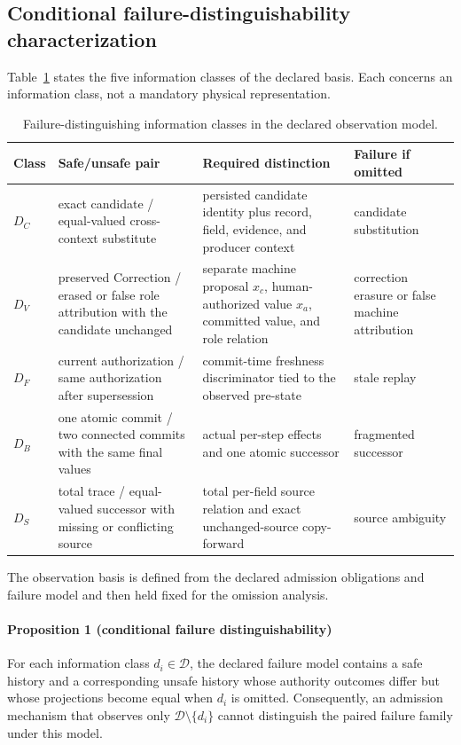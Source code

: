\subsection{Conditional failure-distinguishability characterization}

Table~\ref{tab:distinctions} states the five information classes of the declared basis. Each concerns an information class, not a mandatory physical representation.

\begin{table}[t]
\centering
\footnotesize
\caption{Failure-distinguishing information classes in the declared observation model.}
\label{tab:distinctions}
\begin{tabularx}{\textwidth}{@{}l>{\raggedright\arraybackslash}p{}>{\raggedright\arraybackslash}p{}>{\raggedright\arraybackslash}X@{}}
\toprule
Class & Safe/unsafe pair & Required distinction & Failure if omitted \\
\midrule
$D_C$ & exact candidate / equal-valued cross-context substitute & persisted candidate identity plus record, field, evidence, and producer context & candidate substitution \\
$D_V$ & preserved Correction / erased or false role attribution with the candidate unchanged & separate machine proposal $x_c$, human-authorized value $x_a$, committed value, and role relation & correction erasure or false machine attribution \\
$D_F$ & current authorization / same authorization after supersession & commit-time freshness discriminator tied to the observed pre-state & stale replay \\
$D_B$ & one atomic commit / two connected commits with the same final values & actual per-step effects and one atomic successor & fragmented successor \\
$D_S$ & total trace / equal-valued successor with missing or conflicting source & total per-field source relation and exact unchanged-source copy-forward & source ambiguity \\
\bottomrule
\end{tabularx}
\end{table}

The observation basis is defined from the declared admission obligations and failure model and then held fixed for the omission analysis.

\paragraph{Proposition 1 (conditional failure distinguishability)}
For each information class $d_i\in\mathcal D$, the declared failure model contains a safe history and a corresponding unsafe history whose authority outcomes differ but whose projections become equal when $d_i$ is omitted. Consequently, an admission mechanism that observes only $\mathcal D\setminus\{d_i\}$ cannot distinguish the paired failure family under this model.

